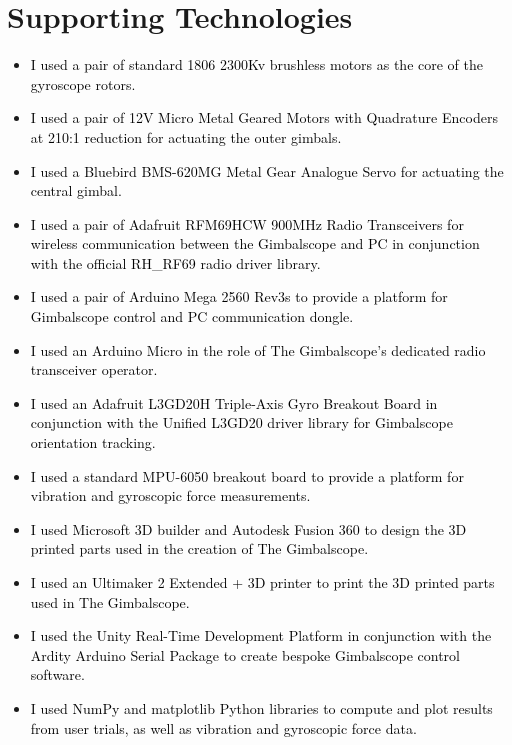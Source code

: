 \documentclass[a4paper]{article}
\newcommand\liststyleWWNumxxi{%
\renewcommand\labelitemi{[F0B7?]}
\renewcommand\labelitemii{o}
\renewcommand\labelitemiii{[F0A7?]}
\renewcommand\labelitemiv{[F0B7?]}
}
\begin{document}
\clearpage\section{Supporting Technologies}
\hypertarget{Toc98342030}{}
\bigskip

\liststyleWWNumxxi
\begin{itemize}
\item \textcolor{black}{I used a pair of standard 1806 2300Kv brushless motors as the core of the gyroscope rotors.}
\item \textcolor{black}{I used a pair of 12V Micro Metal Geared Motors with Quadrature Encoders at 210:1 reduction for
actuating the outer gimbals.}
\item \textcolor{black}{I used a Bluebird BMS-620MG Metal Gear Analogue Servo for actuating the central gimbal.}
\item \textcolor{black}{I used a pair of Adafruit RFM69HCW 900MHz Radio Transceivers for wireless communication between
the Gimbalscope and PC in conjunction with the official RH\_RF69 radio driver library.}
\item \textcolor{black}{I used a pair of Arduino Mega 2560 Rev3s to provide a platform for Gimbalscope control and PC
communication dongle.}
\item \textcolor{black}{I used an Arduino Micro in the role of The Gimbalscope's dedicated radio transceiver operator.}
\item \textcolor{black}{I used an Adafruit L3GD20H Triple-Axis Gyro Breakout Board in conjunction with the Unified
L3GD20 driver library for Gimbalscope orientation tracking.}
\item \textcolor{black}{I used a standard MPU-6050 breakout board to provide a platform for vibration and gyroscopic
force measurements.}
\item \textcolor{black}{I used Microsoft 3D builder and Autodesk Fusion 360 to design the 3D printed parts used in the
creation of The Gimbalscope.}
\item \textcolor{black}{I used an Ultimaker 2 Extended + 3D printer to print the 3D printed parts used in The
Gimbalscope.}
\item \textcolor{black}{I used the Unity Real-Time Development Platform in conjunction with the Ardity Arduino Serial
Package to create bespoke Gimbalscope control software.}
\item \textcolor{black}{I used NumPy and matplotlib Python libraries to compute and plot results from user trials, as
well as vibration and gyroscopic force data.}
\end{itemize}
\end{document}
